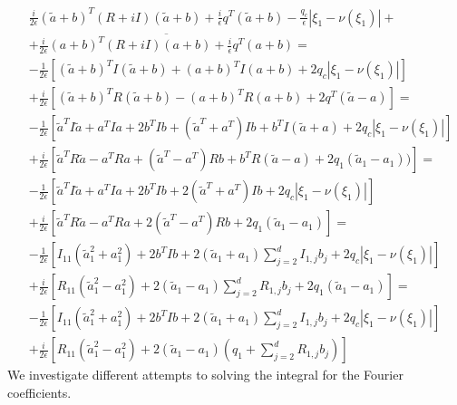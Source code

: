 \begin{equation}
  \begin{split}
   &     \frac{i}{2\epsilon}(\tilde{a} + b)^T(R + i I)(\tilde{a} + b) +
   \frac{i}{\epsilon}q^T(\tilde{a} + b)
  -\frac{q_c}{\epsilon}|\xi_1 - \nu(\xi_1)| +
  \\
  &
  + \overline{\frac{i}{2\epsilon}(a + b)^T(R + iI)(a + b) +
      \frac{i}{\epsilon}q^T(a + b)} = 
  \\
  &
  -\frac{1}{2\epsilon}\left[ 
    (\tilde{a} + b)^T I(\tilde{a} + b) 
    + (a + b)^T I(a + b) 
  + 2q_c |\xi_1 - \nu(\xi_1)| 
  \right]
  \\
  &
  +\frac{i}{2\epsilon}\left[ 
    (\tilde{a} + b)^T R(\tilde{a} + b) 
    - (a + b)^T R(a + b) + 2q^T(\tilde{a} - a) 
  \right]
  =
  \\
  &
  -\frac{1}{2\epsilon}\left[ 
    \tilde{a}^T I \tilde{a} + a^T Ia 
    + 2b^T I b + (\tilde{a}^T + a^T)I b
    + b^TI(\tilde{a} + a)
  + 2q_c |\xi_1 - \nu(\xi_1)| 
  \right]
  \\
  &
  +\frac{i}{2\epsilon}\left[ 
    \tilde{a}^T R \tilde{a} - a^T Ra 
     + (\tilde{a}^T - a^T)R b
    + b^TR(\tilde{a}  - a)
    + 2q_1(\tilde{a}_1 - a_1)) 
  \right]
  =
  \\
  &
  -\frac{1}{2\epsilon}\left[ 
  \tilde{a}^T I \tilde{a} + a^T Ia 
    + 2b^T I b + 2(\tilde{a}^T + a^T)I b
  + 2q_c |\xi_1 - \nu(\xi_1)| 
  \right]
  \\
  &
  +\frac{i}{2\epsilon}\left[ 
    \tilde{a}^T R \tilde{a} - a^T Ra 
     + 2(\tilde{a}^T - a^T)R b
    + 2q_1(\tilde{a}_1 - a_1) 
  \right]
  =
  \\
  &
  -\frac{1}{2\epsilon}\left[ 
    I_{11}(\tilde{a}_1^2 + a_1^2) 
    + 2b^T I b + 2(\tilde{a}_1 + a_1)\sum_{j = 2}^d I_{1,j} b_j
  + 2q_c |\xi_1 - \nu(\xi_1)| 
  \right]
  \\
  &
  +\frac{i}{2\epsilon}\left[ 
    R_{11} (\tilde{a}_1^2 - a_1^2)  
    + 2(\tilde{a}_1 - a_1)\sum_{j=2}^d R_{1,j} b_j
    + 2q_1(\tilde{a}_1 - a_1) 
  \right]
  =
  \\
  &
  -\frac{1}{2\epsilon}\left[ 
    I_{11}(\tilde{a}_1^2 + a_1^2) 
    + 2b^T I b + 2(\tilde{a}_1 + a_1)\sum_{j = 2}^d I_{1,j} b_j
  + 2q_c |\xi_1 - \nu(\xi_1)| 
  \right]
  \\
  &
  +\frac{i}{2\epsilon}\left[ 
    R_{11} (\tilde{a}_1^2 - a_1^2)  
    + 2(\tilde{a}_1 - a_1)\left(q_1 + \sum_{j=2}^d R_{1,j} b_j\right) 
  \right]
  \end{split}
\end{equation}
We investigate different attempts to solving the integral for the Fourier coefficients. 
